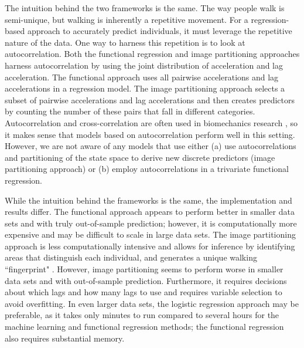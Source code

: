 The intuition behind the two frameworks is the same. The way people walk is semi-unique, but walking is inherently a repetitive movement. For a regression-based approach to accurately predict individuals, it must leverage the repetitive nature of the data. One way to harness this repetition is to look at autocorrelation. Both the functional regression and image partitioning approaches harness autocorrelation by using the joint distribution of acceleration and lag acceleration. The functional approach uses all pairwise accelerations and lag accelerations in a regression model. The image partitioning approach selects a subset of pairwise accelerations and lag accelerations and then creates predictors by counting the number of these pairs that fall in different categories. Autocorrelation and cross-correlation are often used in biomechanics research \cite{Pierrynowski2016, NelsonWong2009}, so it makes sense that models based on autocorrelation perform well in this setting. However, we are not aware of any models that use either (a) use autocorrelations and partitioning of the state space to derive new discrete predictors (image partitioning approach) or (b) employ autocorrelations in a trivariate functional regression.


While the intuition behind the frameworks is the same, the implementation and results differ. The functional approach appears to perform better in smaller data sets and with truly out-of-sample prediction; however, it is computationally more expensive and may be difficult to scale in large data sets. The image partitioning approach is less computationally intensive and allows for inference by identifying areas that distinguish each individual, and generates a unique walking ``fingerprint" \cite{koffman_fingerprinting_2023}. However, image partitioning seems to perform worse in smaller data sets and with out-of-sample prediction. Furthermore, it requires decisions about which lags and how many lags to use and requires variable selection to avoid overfitting. In even larger data sets, the logistic regression approach may be preferable, as it takes only minutes to run compared to several hours for the machine learning and functional regression methods; the functional regression also requires substantial memory. 



